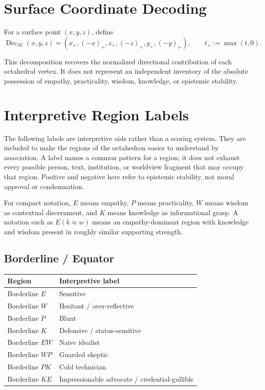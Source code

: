 \documentclass[11pt]{article}
\begin{document}
\section{Surface Coordinate Decoding}

For a surface point $(x,y,z)$, define
\[
\operatorname{Dec}_{\partial\mathbb O}(x,y,z)
=
\left(
x_{+},(-x)_{+},
z_{+},(-z)_{+},
y_{+},(-y)_{+}
\right),
\qquad
t_{+}:=\max(t,0).
\]

This decomposition recovers the normalized directional contribution of each octahedral vertex. It does not represent an independent inventory of the absolute possession of empathy, practicality, wisdom, knowledge, or epistemic stability.

\section{Interpretive Region Labels}

The following labels are interpretive aids rather than a scoring system. They are included to make the regions of the octahedron easier to understand by association. A label names a common pattern for a region; it does not exhaust every possible person, text, institution, or worldview fragment that may occupy that region. Positive and negative here refer to epistemic stability, not moral approval or condemnation.

For compact notation, $E$ means empathy, $P$ means practicality, $W$ means wisdom as contextual discernment, and $K$ means knowledge as informational grasp. A notation such as $E(k \approx w)$ means an empathy-dominant region with knowledge and wisdom present in roughly similar supporting strength.

\subsection*{Borderline / Equator}
\begin{center}
\begin{tabular}{>{\raggedright\arraybackslash}p{4.3cm} >{\raggedright\arraybackslash}p{8.9cm}}
\toprule
Region & Interpretive label \\
\midrule
Borderline $E$ & Sensitive \\
Borderline $W$ & Hesitant / over-reflective \\
Borderline $P$ & Blunt \\
Borderline $K$ & Defensive / status-sensitive \\
Borderline $EW$ & Naive idealist \\
Borderline $WP$ & Guarded skeptic \\
Borderline $PK$ & Cold technician \\
Borderline $KE$ & Impressionable advocate / credential-gullible \\
\bottomrule
\end{tabular}
\end{center}
\end{document}

